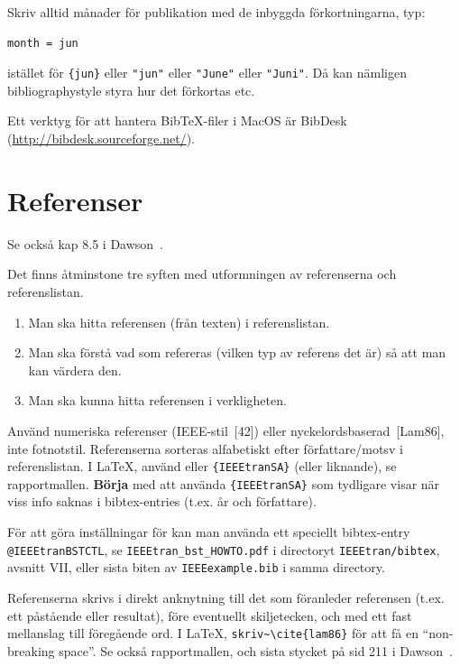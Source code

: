\documentclass[a4paper,12pt]{article}
\begin{document}
Skriv alltid månader för publikation med de inbyggda förkortningarna, typ:
\begin{verbatim}
month = jun
\end{verbatim}
istället för \verb|{jun}| eller \verb|"jun"| eller \verb|"June"| eller \verb|"Juni"|. Då kan nämligen bibliographystyle styra hur det förkortas etc.

Ett verktyg för att hantera BibTeX-filer i MacOS är BibDesk (\url{http://bibdesk.sourceforge.net/}).

\section{Referenser}
\label{sec:referenser}

Se också kap 8.5 i Dawson~\cite{dawson:projects-in-computing}.

Det finns åtminstone tre syften med utformningen av referenserna och referenslistan.
\begin{enumerate}
\item Man ska hitta referensen (från texten) i referenslistan.
\item Man ska förstå vad som refereras (vilken typ av referens det är) så att man kan värdera den.
\item Man ska kunna hitta referensen i verkligheten.
\end{enumerate}

Använd numeriska referenser (IEEE-stil~[42]) eller nyckelordsbaserad~[Lam86], inte fotnotstil. Referenserna sorteras alfabetiskt efter författare/motsv i referenslistan. I LaTeX, använd \verb|| eller \verb|{IEEEtranSA}| (eller liknande), se rapportmallen. \textbf{Börja} med att använda \verb|{IEEEtranSA}| som tydligare visar när viss info saknas i bibtex-entries (t.ex. år och författare).

För att göra inställningar för \verb|| kan man använda ett speciellt bibtex-entry \texttt{@IEEEtranBSTCTL}, se \texttt{IEEEtran\_bst\_HOWTO.pdf} i directoryt \texttt{IEEEtran/bibtex}, avsnitt VII, eller sista biten av \texttt{IEEEexample.bib} i samma directory.

Referenserna skrivs i direkt anknytning till det som föranleder referensen (t.ex. ett påstående eller resultat), före eventuellt skiljetecken, och med ett fast mellanslag till föregående ord. I La\TeX, \verb|skriv~\cite{lam86}| för att få en ``non-breaking space''. Se också rapportmallen, och sista stycket på sid 211 i Dawson~\cite{dawson:projects-in-computing}.
\end{document}
